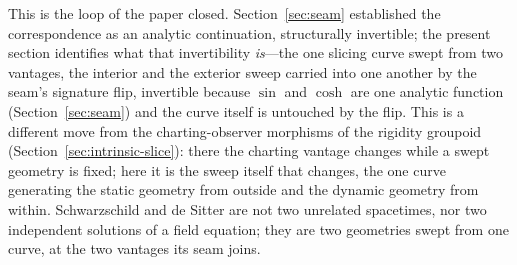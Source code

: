 \documentclass[11pt,a4paper]{article}
\theoremstyle{definition}
\begin{document}
This is the loop of the paper closed. Section~\ref{sec:seam} established the correspondence as an analytic continuation, structurally invertible; the present section identifies what that invertibility \emph{is}---the one slicing curve swept from two vantages, the interior and the exterior sweep carried into one another by the seam's signature flip, invertible because $\sin$ and $\cosh$ are one analytic function (Section~\ref{sec:seam}) and the curve itself is untouched by the flip. This is a different move from the charting-observer morphisms of the rigidity groupoid (Section~\ref{sec:intrinsic-slice}): there the charting vantage changes while a swept geometry is fixed; here it is the sweep itself that changes, the one curve generating the static geometry from outside and the dynamic geometry from within. Schwarzschild and de Sitter are not two unrelated spacetimes, nor two independent solutions of a field equation; they are two geometries swept from one curve, at the two vantages its seam joins.
\end{document}
